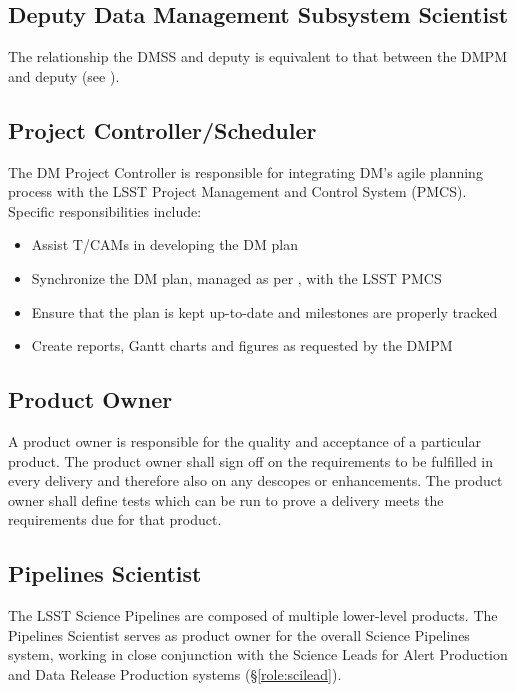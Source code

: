 \subsection{Deputy Data Management Subsystem Scientist}\label{role:ddmss}

The relationship the \gls{DMSS} and deputy is equivalent to that between the \gls{DMPM} and deputy (see ).


\subsection{Project Controller/Scheduler \label{role:pcon}}

The \gls{DM} Project Controller is responsible for integrating \gls{DM}'s agile planning process with the \gls{LSST} Project Management and Control System (\gls{PMCS}). Specific responsibilities include:

\begin{itemize}

  \item{Assist T/CAMs in developing the \gls{DM} plan}
  \item{Synchronize the \gls{DM} plan, managed as per , with the \gls{LSST} PMCS}
  \item{Ensure that the plan is kept up-to-date and milestones are properly tracked}
  \item{Create reports, Gantt charts and figures as requested by the \gls{DMPM}}

\end{itemize}

\subsection{Product Owner \label{role:prodo}}

A product owner is responsible for the quality and acceptance of a particular product.
The product owner shall sign off on the requirements to be fulfilled in every delivery and therefore also on any descopes or enhancements.
The product owner shall define tests which can be run to prove a delivery meets the requirements due for that product.

\subsection{Pipelines Scientist \label{role:pipe}}

The LSST Science Pipelines are composed of multiple lower-level products.
The Pipelines Scientist serves as product owner for the overall Science Pipelines system, working in close conjunction with the Science Leads for Alert Production and Data Release Production systems (\S\ref{role:scilead}).

